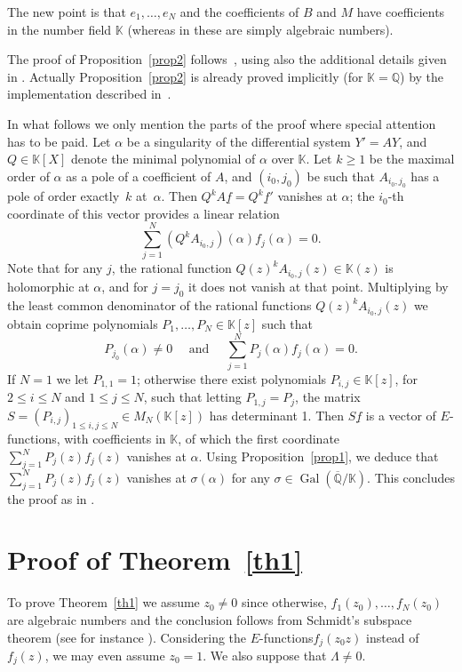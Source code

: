 \documentclass[11pt]{article}
\numberwithin{equation}{section}
\newcommand{\Efunctions}{$E$\nobreakdash-func\-tions\xspace}
\theoremstyle{definition}
\newcommand{\Q}{\mathbb{Q}}
\newcommand{\K}{\mathbb{K}}
\newcommand{\Qbar}{\overline{\mathbb Q}}
\DeclareMathOperator{\Gal}{Gal}
\begin{document}
The new point is that $e_1,\ldots,e_N$ and the coefficients of $B$ and $M$ have coefficients in the number field $\K$ (whereas in \cite[Th.\,1.5]{beukers} these are simply algebraic numbers).

The proof of Proposition~\ref{prop2} follows~\cite[p.\,378]{beukers}, using also the additional details given in \cite{BRS2}. Actually Proposition~\ref{prop2} is already proved
implicitly (for $\K=\Q$) by the implementation described in~\cite{BRS2}.

In what follows we only mention the parts of the proof where special attention has to be paid. Let $\alpha$ be a singularity of the differential system $Y'=AY$, and $Q\in\K[X]$ denote the minimal polynomial of $\alpha$ over $\K$. Let $k\geq 1$ be the maximal order of $\alpha$ as a pole of a coefficient of $A$, and $(i_0,j_0)$ be such that $A_{i_0,j_0}$ has a pole of order exactly~$k$ at~$\alpha$. Then $Q^k A\underline f = Q^k \underline f'$ vanishes at $\alpha$; the $i_0$-th coordinate of this vector provides a linear relation
\[
\sum_{j=1}^N (Q^k A_{i_0,j})(\alpha) f_j(\alpha)=0.
\]
Note that for any $j$, the rational function $Q(z)^k A_{i_0,j}(z)\in\K(z)$ is holomorphic at $\alpha$, and for $j=j_0$ it does not vanish at that point. Multiplying by the least common denominator of the rational functions $Q(z)^k A_{i_0,j}(z) $ we obtain coprime polynomials $P_1,\ldots,P_N\in\K[z]$ such that
\[
P_{j_0}(\alpha)\neq 0 \quad \mbox{ and }\quad \sum_{j=1}^N P_j(\alpha) f_j(\alpha)=0.
\]
If $N=1$ we let $P_{1,1}=1$; otherwise there exist polynomials $P_{i,j}\in\K[z]$, for $2\leq i \leq N$ and $1\leq j \leq N$, such that letting $P_{1,j}=P_j$, the matrix $S = (P_{i,j})_{1\leq i,j\leq N}\in M_N(\K[z])$ has determinant 1. Then $S \underline f $ is a vector of \Efunctions, with coefficients in $\K$, of which the first coordinate $ \sum_{j=1}^N P_j(z) f_j(z)$ vanishes at $ \alpha $. Using Proposition~\ref{prop1}, we deduce that $ \sum_{j=1}^N P_j(z) f_j(z)$ vanishes at $\sigma(\alpha)$ for any $\sigma\in\Gal(\Qbar/\K)$. This concludes the proof as in \cite{beukers}.

\section{Proof of Theorem~\ref{th1}} \label{secpreuveth1}

To prove Theorem~\ref{th1} we assume $z_0\neq 0$ since otherwise, $f_1(z_0),\ldots,f_N(z_0)$ are algebraic numbers and the conclusion follows from Schmidt's subspace theorem (see for instance \cite[Ch.\,1, \S 8.2, Th.\,1.37]{EMS}). Considering the \Efunctions $f_j(z_0z)$ instead of $f_j(z)$, we may even assume $z_0=1$. We also suppose that $\Lambda\neq 0$.
\end{document}
